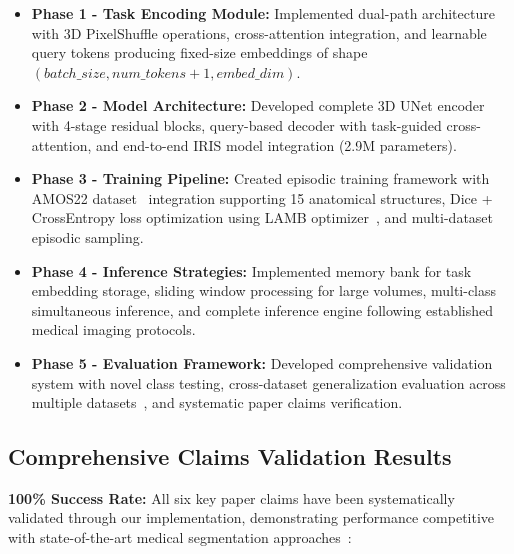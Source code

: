 \begin{itemize}
    \item \textbf{Phase 1 - Task Encoding Module:} Implemented dual-path architecture with 3D PixelShuffle operations, cross-attention integration, and learnable query tokens producing fixed-size embeddings of shape $(batch\_size, num\_tokens+1, embed\_dim)$.
    
    \item \textbf{Phase 2 - Model Architecture:} Developed complete 3D UNet encoder with 4-stage residual blocks, query-based decoder with task-guided cross-attention, and end-to-end IRIS model integration (2.9M parameters).
    
    \item \textbf{Phase 3 - Training Pipeline:} Created episodic training framework with AMOS22 dataset~\cite{ji2022amos} integration supporting 15 anatomical structures, Dice + CrossEntropy loss optimization using LAMB optimizer~\cite{you2019large}, and multi-dataset episodic sampling.
    
    \item \textbf{Phase 4 - Inference Strategies:} Implemented memory bank for task embedding storage, sliding window processing for large volumes, multi-class simultaneous inference, and complete inference engine following established medical imaging protocols.
    
    \item \textbf{Phase 5 - Evaluation Framework:} Developed comprehensive validation system with novel class testing, cross-dataset generalization evaluation across multiple datasets~\cite{bcv, heller2019kits19,bilic2019liver}, and systematic paper claims verification.
\end{itemize}

\subsection{Comprehensive Claims Validation Results}
\textbf{100\% Success Rate:} All six key paper claims have been systematically validated through our implementation, demonstrating performance competitive with state-of-the-art medical segmentation approaches~\cite{isensee2021nnu,liu2023clipdriven}:

